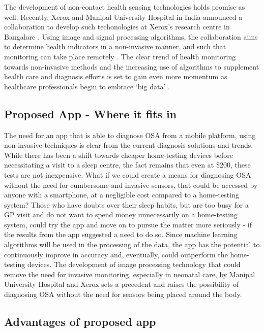 The development of non-contact health sensing technologies holds promise as well. Recently, Xerox and Manipal University Hospital in India announced a collaboration to develop such techonologies at Xerox's research centre in Bangalore \cite{xerox1, xerox2}. Using image and signal processing algorithms, the collaboration aims to determine health indicators in a non-invasive manner, and such that monitoring can take place remotely \cite{xerox1}. The clear trend of health monitoring towards non-invasive methods and the increasing use of algorithms to supplement health care and diagnosis efforts is set to gain even more momentum as healthcare professionals begin to embrace `big data' \cite{bigdata}.

\subsection{Proposed App - Where it fits in}

The need for an app that is able to diagnose OSA from a mobile platform, using non-invasive techniques is clear from the current diagnosis solutions and trends. While there has been a shift towards cheaper home-testing devices before necessitating a visit to a sleep centre, the fact remains that even at \$200, these tests are not inexpensive. What if we could create a means for diagnosing OSA without the need for cumbersome and invasive sensors, that could be accessed by anyone with a smartphone, at a negligible cost compared to a home-testing system? Those who have doubts over their sleep habits, but are too busy for a GP visit and do not want to spend money unnecessarily on a home-testing system, could try the app and move on to pursue the matter more seriously - if the results from the app suggested a need to do so. Since machine learning algorithms will be used in the processing of the data, the app has the potential to continuously improve in accuracy and, eventually, could outperform the home-testing devices. The development of image processing technology that could remove the need for invasive monitoring, especially in neonatal care, by Manipal University Hospital and Xerox sets a precedent and raises the possibility of diagnosing OSA without the need for sensors being placed around the body.


\subsection{Advantages of proposed app}


